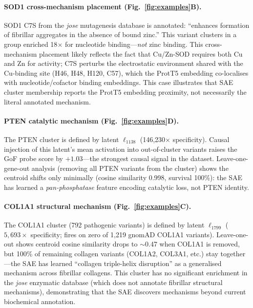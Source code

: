 \documentclass[10pt]{article}
\newcommand{\latent}[1]{$\ell_{#1}$}
\begin{document}
\paragraph{SOD1 cross-mechanism placement (Fig.~\ref{fig:examples}B).}
SOD1 C7S from the \emph{jose} mutagenesis database is annotated: ``enhances formation of
fibrillar aggregates in the absence of bound zinc.'' This variant clusters in a group enriched
18$\times$ for nucleotide binding---\emph{not} zinc binding. This cross-mechanism placement
likely reflects the fact that Cu/Zn-SOD requires both Cu and Zn for activity; C7S perturbs
the electrostatic environment shared with the Cu-binding site (H46, H48, H120, C57), which
the ProtT5 embedding co-localises with nucleotide/cofactor binding embeddings. This case
illustrates that SAE cluster membership reports the ProtT5 embedding proximity, not
necessarily the literal annotated mechanism.

\paragraph{PTEN catalytic mechanism (Fig.~\ref{fig:examples}D).}
The PTEN cluster is defined by latent \latent{1138} (146,230$\times$ specificity).
Causal injection of this latent's mean activation into out-of-cluster variants raises the
GoF probe score by $+1.03$---the strongest causal signal in the dataset. Leave-one-gene-out
analysis (removing all PTEN variants from the cluster) shows the centroid shifts only
minimally (cosine similarity 0.998, survival 100\%): the SAE has learned a
\emph{pan-phosphatase} feature encoding catalytic loss, not PTEN identity.

\paragraph{COL1A1 structural mechanism (Fig.~\ref{fig:examples}C).}
The COL1A1 cluster (792 pathogenic variants) is defined by latent \latent{1799}
($5{,}693\times$ specificity; fires on zero of 1,219 gnomAD COL1A1 variants). Leave-one-out
shows centroid cosine similarity drops to $\sim$0.47 when COL1A1 is removed, but 100\% of
remaining collagen variants (COL1A2, COL3A1, etc.) stay together---the SAE has learned
``collagen triple-helix disruption'' as a generalised mechanism across fibrillar collagens.
This cluster has no significant enrichment in the \emph{jose} enzymatic database (which does
not annotate fibrillar structural mechanisms), demonstrating that the SAE discovers mechanisms
beyond current biochemical annotation.
\end{document}
